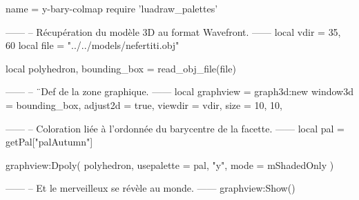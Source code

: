 \documentclass{standalone}
\begin{document}
\begin{luadraw}{name = y-bary-colmap}
require 'luadraw_palettes'

------
-- Récupération du modèle 3D au format Wavefront.
------
local vdir = {35, 60}
local file = "../../models/nefertiti.obj"

local polyhedron, bounding_box = read_obj_file(file)

------
-- ¨Def de la zone graphique.
------
local graphview = graph3d:new{
  window3d = bounding_box,
  adjust2d = true,
  viewdir  = vdir,
  size     = {10, 10},
}

------
-- Coloration liée à l'ordonnée du barycentre de la facette.
------
local pal = getPal["palAutumn"]

graphview:Dpoly(
  polyhedron,
  {
    usepalette = {pal, "y"},
    mode       = mShadedOnly
  }
)

------
-- Et le merveilleux se révèle au monde.
------
graphview:Show()
\end{luadraw}
\end{document}
